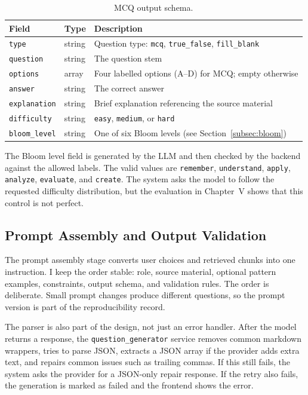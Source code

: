 \documentclass[12pt,a4paper]{article}
\begin{document}
\begin{table}[H]
  \centering
  \singlespacing
  \caption{MCQ output schema.}
  \label{tab:mcq-schema}
  \begin{tabular}{@{}p{3.7cm}p{2.2cm}p{7.1cm}@{}}
    \toprule
    \textbf{Field} & \textbf{Type} & \textbf{Description} \\
    \midrule
    \texttt{type}        & string  & Question type: \texttt{mcq}, \texttt{true\_false}, \texttt{fill\_blank} \\
    \texttt{question}    & string  & The question stem \\
    \texttt{options}     & array   & Four labelled options (A–D) for MCQ; empty otherwise \\
    \texttt{answer}      & string  & The correct answer \\
    \texttt{explanation} & string  & Brief explanation referencing the source material \\
    \texttt{difficulty}  & string  & \texttt{easy}, \texttt{medium}, or \texttt{hard} \\
    \texttt{bloom\_level} & string & One of six Bloom levels (see Section~\ref{subsec:bloom}) \\
    \bottomrule
  \end{tabular}
\end{table}

The Bloom level field is generated by the LLM and then checked by the
backend against the allowed labels. The valid values are
\texttt{remember}, \texttt{understand}, \texttt{apply}, \texttt{analyze},
\texttt{evaluate}, and \texttt{create}. The system asks the model to follow
the requested difficulty distribution, but the evaluation in Chapter~V shows
that this control is not perfect.

\subsection{Prompt Assembly and Output Validation}

The prompt assembly stage converts user choices and retrieved chunks into
one instruction. I keep the order stable: role, source material, optional
pattern examples, constraints, output schema, and validation rules. The
order is deliberate. Small prompt changes produce different questions, so
the prompt version is part of the reproducibility record.

The parser is also part of the design, not just an error handler. After the
model returns a response, the \texttt{question\_generator} service removes
common markdown wrappers, tries to parse JSON, extracts a JSON array if the
provider adds extra text, and repairs common issues such as trailing commas.
If this still fails, the system asks the provider for a JSON-only repair
response. If the retry also fails, the generation is marked as failed and
the frontend shows the error.
\end{document}
